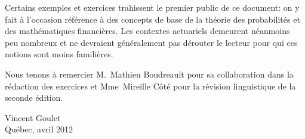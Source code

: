 Certains exemples et exercices trahissent le premier public de ce
document: on y fait à l'occasion référence à des concepts de base de
la théorie des probabilités et des mathématiques financières. Les
contextes actuariels demeurent néanmoins peu nombreux et ne devraient
généralement pas dérouter le lecteur pour qui ces notions sont moins
familières.

Nous tenons à remercier M.~Mathieu Boudreault pour sa collaboration
dans la rédaction des exercices et Mme~Mireille Côté pour la révision
linguistique de la seconde édition.

\begin{flushright}
  Vincent Goulet \\
  Québec, avril 2012
\end{flushright}


